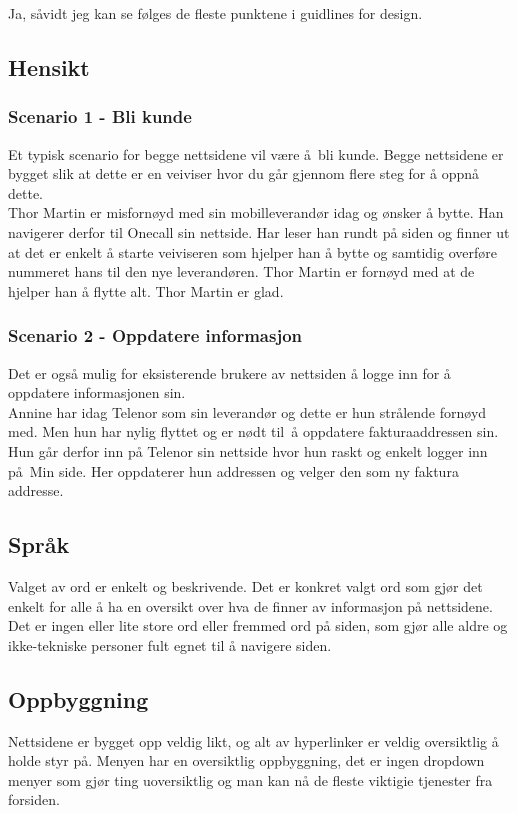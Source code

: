 \documentclass[a4paper, 10pt]{article}
\begin{document}
Ja, såvidt jeg kan se følges de fleste punktene i guidlines for design.


\subsection*{Hensikt}
\subsubsection*{Scenario 1 - Bli kunde}
Et typisk scenario for begge nettsidene vil være å bli kunde. Begge nettsidene er bygget slik at dette er en veiviser hvor du går gjennom flere steg for å oppnå dette.\\

Thor Martin er misfornøyd med sin mobilleverandør idag og ønsker å bytte. Han navigerer derfor til Onecall sin nettside. Har leser han rundt på siden og finner ut at det er enkelt å starte veiviseren som hjelper han å bytte og samtidig overføre nummeret hans til den nye leverandøren. Thor Martin er fornøyd med at de hjelper han å flytte alt. Thor Martin er glad.

\subsubsection*{Scenario 2 - Oppdatere informasjon}
Det er også mulig for eksisterende brukere av nettsiden å logge inn for å oppdatere informasjonen sin.\\

Annine har idag Telenor som sin leverandør og dette er hun strålende fornøyd med. Men hun har nylig flyttet og er nødt til å oppdatere fakturaaddressen sin. Hun går derfor inn på Telenor sin nettside hvor hun raskt og enkelt logger inn på Min side. Her oppdaterer hun addressen og velger den som ny faktura addresse.

\subsection*{Språk}
Valget av ord er enkelt og beskrivende. Det er konkret valgt ord som gjør det enkelt for alle å ha en oversikt over hva de finner av informasjon på nettsidene. Det er ingen eller lite store ord eller fremmed ord på siden, som gjør alle aldre og ikke-tekniske personer fult egnet til å navigere siden.

\subsection*{Oppbyggning}
Nettsidene er bygget opp veldig likt, og alt av hyperlinker er veldig oversiktlig å holde styr på. Menyen har en oversiktlig oppbyggning, det er ingen dropdown menyer som gjør ting uoversiktlig og man kan nå de fleste viktigie tjenester fra forsiden.
\end{document}
